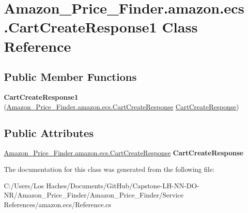 \hypertarget{class_amazon___price___finder_1_1amazon_1_1ecs_1_1_cart_create_response1}{\section{Amazon\-\_\-\-Price\-\_\-\-Finder.\-amazon.\-ecs.\-Cart\-Create\-Response1 Class Reference}
\label{class_amazon___price___finder_1_1amazon_1_1ecs_1_1_cart_create_response1}
}
\subsection*{Public Member Functions}
\begin{DoxyCompactItemize}
\item 
\hypertarget{class_amazon___price___finder_1_1amazon_1_1ecs_1_1_cart_create_response1_a690bc1316b5771457906a1763b7dde11}{{\bfseries Cart\-Create\-Response1} (\hyperlink{class_amazon___price___finder_1_1amazon_1_1ecs_1_1_cart_create_response}{Amazon\-\_\-\-Price\-\_\-\-Finder.\-amazon.\-ecs.\-Cart\-Create\-Response} \hyperlink{class_amazon___price___finder_1_1amazon_1_1ecs_1_1_cart_create_response}{Cart\-Create\-Response})}\label{class_amazon___price___finder_1_1amazon_1_1ecs_1_1_cart_create_response1_a690bc1316b5771457906a1763b7dde11}

\end{DoxyCompactItemize}
\subsection*{Public Attributes}
\begin{DoxyCompactItemize}
\item 
\hypertarget{class_amazon___price___finder_1_1amazon_1_1ecs_1_1_cart_create_response1_a8be4234b17582362f991d793394fa03f}{\hyperlink{class_amazon___price___finder_1_1amazon_1_1ecs_1_1_cart_create_response}{Amazon\-\_\-\-Price\-\_\-\-Finder.\-amazon.\-ecs.\-Cart\-Create\-Response} {\bfseries Cart\-Create\-Response}}\label{class_amazon___price___finder_1_1amazon_1_1ecs_1_1_cart_create_response1_a8be4234b17582362f991d793394fa03f}

\end{DoxyCompactItemize}


The documentation for this class was generated from the following file\-:\begin{DoxyCompactItemize}
\item 
C\-:/\-Users/\-Los Haches/\-Documents/\-Git\-Hub/\-Capstone-\/\-L\-H-\/\-N\-N-\/\-D\-O-\/\-N\-R/\-Amazon\-\_\-\-Price\-\_\-\-Finder/\-Amazon\-\_\-\-Price\-\_\-\-Finder/\-Service References/amazon.\-ecs/Reference.\-cs\end{DoxyCompactItemize}

